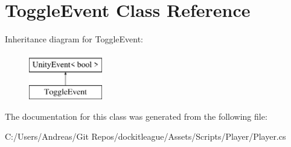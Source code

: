 \hypertarget{class_toggle_event}{}\section{Toggle\+Event Class Reference}
\label{class_toggle_event}
Inheritance diagram for Toggle\+Event\+:\begin{figure}[H]
\begin{center}
\leavevmode
\includegraphics[height=2.000000cm]{class_toggle_event}
\end{center}
\end{figure}


The documentation for this class was generated from the following file\+:\begin{DoxyCompactItemize}
\item 
C\+:/\+Users/\+Andreas/\+Git Repos/dockitleague/\+Assets/\+Scripts/\+Player/Player.\+cs\end{DoxyCompactItemize}
